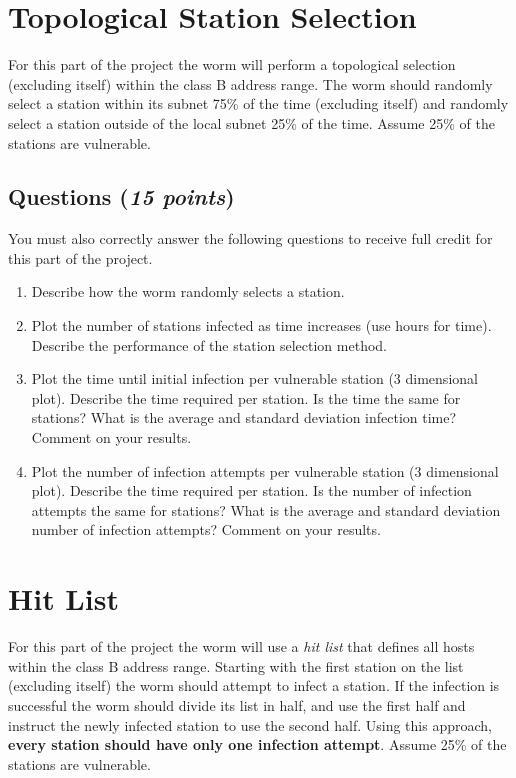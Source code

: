 \documentclass[10pt]{article}
\newcommand{\Section}[1]{
\noindent
\hrulefill
\vspace{-0.15in}
\section{#1}
}
\newcommand{\Questions}[1]{
\subsection*{Questions {\rm \normalsize (\textsf{\textit{#1 points}})}}
}
\begin{document}
\Section{Topological Station Selection}

For this part of the project the worm will perform a topological
selection (excluding itself) within the class B address range. The
worm should randomly select a station within its subnet 75\% of
the time (excluding itself) and randomly select a station outside
of the local subnet 25\% of the time. Assume 25\% of the stations
are vulnerable.

\Questions{15}
You must also correctly answer the following questions to receive
full credit for this part of the project.
\begin{enumerate}
  \item Describe how the worm randomly selects a station.

  \item Plot the number of stations infected as time increases (use hours for time).
Describe the performance of the station selection method.

  \item Plot the time until initial infection per vulnerable
station (3 dimensional plot). Describe the time required per
station. Is the time the same for stations? What is the average
and standard deviation infection time? Comment on your results.

  \item Plot the number of infection attempts per vulnerable
station (3 dimensional plot). Describe the time required per
station. Is the number of infection attempts the same for
stations? What is the average and standard deviation number of
infection attempts? Comment on your results.

\end{enumerate}

\Section{Hit List}

For this part of the project the worm will use a \textit{hit list}
that defines all hosts within the class B address range. Starting
with the first station on the list (excluding itself) the worm
should attempt to infect a station. If the infection is successful
the worm should divide its list in half, and use the first half
and instruct the newly infected station to use the second half.
Using this approach, \textbf{every station should have only one
infection attempt}. Assume 25\% of the stations are vulnerable.
\end{document}
